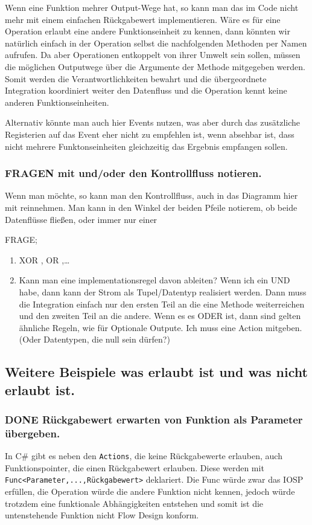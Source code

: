 \documentclass[11pt]{article}
\begin{document}
Wenn eine Funktion mehrer Output-Wege hat, so kann man das im Code nicht mehr mit einem einfachen Rückgabewert implementieren.
Wäre es für eine Operation erlaubt eine andere Funktionseinheit zu kennen, dann könnten wir natürlich einfach in der Operation selbst
die nachfolgenden Methoden per Namen aufrufen. Da aber Operationen entkoppelt von ihrer Umwelt sein sollen, müssen die möglichen
Outputwege über die Argumente der Methode mitgegeben werden. Somit werden die Verantwortlichkeiten bewahrt und die übergeordnete 
Integration koordiniert weiter den Datenfluss und die Operation kennt keine anderen Funktionseinheiten.

Alternativ könnte man auch hier Events nutzen, was aber durch das zusätzliche
Registerien auf das Event eher nicht zu empfehlen ist, wenn absehbar ist, dass
nicht mehrere Funktonseinheiten gleichzeitig das Ergebnis empfangen sollen.

\subsubsection{{\bfseries\sffamily FRAGEN} mit und/oder den Kontrollfluss notieren.}
\label{sec:orgheadline50}
Wenn man möchte, so kann man den Kontrollfluss, auch in das Diagramm hier mit
reinnehmen. Man kann in den Winkel der beiden Pfeile notierem, ob beide
Datenflüsse fließen, oder immer nur einer 

FRAGE; 
\begin{enumerate}
\item XOR , OR ,\ldots{}
\item Kann man eine implementationsregel davon ableiten?
Wenn ich ein UND habe, dann kann der Strom als Tupel/Datentyp realisiert
werden. Dann muss die Integration einfach nur den ersten Teil an die eine
Methode weiterreichen und den zweiten Teil an die andere.
Wenn es es ODER ist, dann sind gelten ähnliche Regeln, wie für Optionale
Outpute.
Ich muss eine Action mitgeben. (Oder Datentypen, die null sein dürfen?)
\end{enumerate}

\subsection{Weitere Beispiele was erlaubt ist und was nicht erlaubt ist.}
\label{sec:orgheadline54}
\subsubsection{{\bfseries\sffamily DONE} Rückgabewert erwarten von Funktion als Parameter übergeben.}
\label{sec:orgheadline52}
In C\# gibt es neben den \texttt{Actions}, die keine Rückgabewerte erlauben, auch Funktionspointer, die einen Rückgabewert erlauben. 
Diese werden mit \texttt{Func<Parameter,...,Rückgabewert>} deklariert.
Die Func würde zwar das IOSP erfüllen, die Operation würde die andere Funktion nicht kennen,
jedoch würde trotzdem eine funktionale Abhängigkeiten entstehen und somit ist die untenstehende Funktion nicht Flow Design konform.
\end{document}
